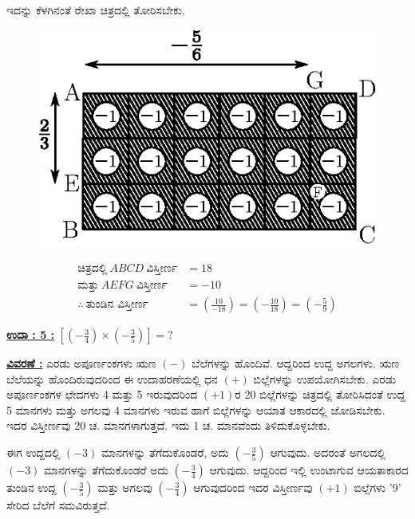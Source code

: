 
ಇದನ್ನು ಕೆಳಗಿನಂತೆ ರೇಖಾ ಚಿತ್ರದಲ್ಲಿ ತೋರಿಸಬೇಕು.
\begin{figure}[H]
\centering
\includegraphics[scale=0.8]{src/figure/chap3/fig3-26b.eps}
\end{figure}
\begin{align*}
\text{ಚಿತ್ರದಲ್ಲಿ}~ ABCD~ \text{ವಿಸ್ತೀರ್ಣ} & = 18\\
\text{ಮತ್ತು}~ AEFG~ \text{ವಿಸ್ತೀರ್ಣ} & = -10\\
\therefore~ \text{ತುಂಡಿನ ವಿಸ್ತೀರ್ಣ} & = \left(\frac{10}{-18} \right) = \left(-\frac{10}{18} \right)=\left(-\frac{5}{9}\right)
\end{align*}


\noindent
{\textbf{\underline{ಉದಾ : 5 :}}} $\left[\left(-\frac{3}{4} \right) \times \left(-\frac{3}{5} \right) \right] = ?$

\noindent
{\textbf{\underline{ವಿವರಣೆ :}}} ಎರಡು ಅಪೂರ್ಣಂಕಗಳು ಋಣ $(-)$ ಬೆಲೆಗಳನ್ನು ಹೊಂದಿವೆ. ಆದ್ದರಿಂದ ಉದ್ದ ಅಗಲಗಳು. ಋಣ ಬೆಲೆಯನ್ನು ಹೊಂದಿರುವುದರಿಂದ ಈ ಉದಾಹರಣೆಯಲ್ಲಿ ಧನ $(+)$ ಬಿಲ್ಲೆಗಳನ್ನು ಉಪಯೋಗಿಸಬೇಕು. ಎರಡು ಅಪೂರ್ಣಂಕಗಳ ಛೇದಗಳು 4 ಮತ್ತು 5 ಇರುವುದರಿಂದ $(+1)$ರ 20 ಬಿಲ್ಲೆಗಳನ್ನು ಚಿತ್ರದಲ್ಲಿ ತೋರಿಸಿದಂತೆ ಉದ್ದ 5 ಮಾನಗಳು ಮತ್ತು ಅಗಲವು 4 ಮಾನಗಳು ಇರುವ ಹಾಗೆ ಬಿಲ್ಲೆಗಳನ್ನು ಆಯಾತ ಆಕಾರದಲ್ಲಿ ಜೋಡಿಸಬೇಕು. ಇದರ ವಿಸ್ತೀರ್ಣವು 20 ಚ. ಮಾನಗಳಾಗುತ್ತದೆ. ಇದು 1 ಚ. ಮಾನವೆಂದು ತಿಳಿದುಕೊಳ್ಳ\break ಬೇಕು. 

ಈಗ ಉದ್ದದಲ್ಲಿ $(-3)$ ಮಾನಗಳನ್ನು ತೆಗೆದುಕೊಂಡರೆ, ಅದು $\left(-\frac{3}{5}\right)$ ಆಗುವುದು. ಅದರಂತೆ ಅಗಲದಲ್ಲಿ $(-3)$ ಮಾನಗಳನ್ನು ತೆಗೆದುಕೊಂಡರೆ ಅದು $\left(-\frac{3}{4} \right)$ ಆಗುವುದು. ಆದ್ದರಿಂದ ಇಲ್ಲಿ ಉಂಟಾಗುವ ಆಯತಾಕಾರದ ತುಂಡಿನ ಉದ್ದ $\left(-\frac{3}{5} \right)$ ಮತ್ತು ಅಗಲವು $\left(-\frac{3}{4}\right)$ ಆಗುವುದರಿಂದ ಇದರ ವಿಸ್ತೀರ್ಣವು $(+1)$ ಬಿಲ್ಲೆಗಳು '9' ಸೇರಿದ ಬೆಲೆಗೆ ಸಮ\-ವಿರುತ್ತದೆ.

